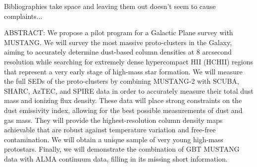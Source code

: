 
\clearpage
{\color{red} Bibliographies take space and leaving them out doesn't seem to cause complaints...}
\footnotesize\raggedright
\noindent 

\normalsize
%


ABSTRACT:
We propose a pilot program for a Galactic Plane survey with MUSTANG.  We will
survey the most massive proto-clusters in the Galaxy, aiming to accurately
determine dust-based column densities at 8 arcsecond resolution while searching
for extremely dense hypercompact HII (HCHII) regions that represent a very
early stage of high-mass star formation.  We will measure the full SEDs of the
proto-clusters by combining MUSTANG-2 with SCUBA, SHARC, AzTEC, and SPIRE data in
order to accurately measure their total dust mass and ionizing flux
density. These data will place strong constraints on the dust emissivity index,
allowing for the best possible measurements of dust and gas mass. 
They will provide the highest-resolution column density maps achievable that
are robust against temperature variation and free-free contamination.
We will obtain a unique sample of very young high-mass protostars.  Finally,
we will demonstrate the combination of GBT MUSTANG data with ALMA continuum
data, filling in its missing short information.


